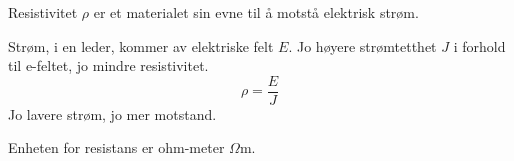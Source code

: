 Resistivitet $\rho$ er et materialet sin evne til å motstå elektrisk strøm.

Strøm, i en leder, kommer av elektriske felt $E$.
Jo høyere strømtetthet $J$ i forhold til e-feltet, jo mindre resistivitet.
$$\rho = \frac{E}{J}$$
Jo lavere strøm, jo mer motstand.

Enheten for resistans er ohm-meter $\Omega$m.
